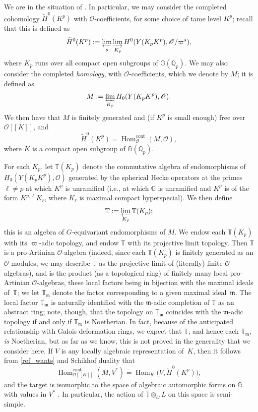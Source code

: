 \documentclass[11pt]{article}
\newcommand{\ie}{i.e.,\xspace}
\let\mathcal\mathscr
\theoremstyle{definition}
\DeclareMathOperator{\Hom}{Hom}
\newcommand{\br}[1]{[\![#1]\!]}
\newcommand{\Q}{\mathbb{Q}}
\newcommand{\Qp}{\mathbb {Q}_p}
\newcommand{\cO}{\mathcal{O}}
\newcommand{\cont}{\mathrm{cont}}
\begin{document}
We are in the situation of \cite[(3.2)]{em0}.
In particular, we may consider the completed cohomology
$\widetilde{H}^0(K^p)$ with $\mathcal O$-coefficients,
for some choice of tame level $K^p$;
recall that this is defined as
\[
\widetilde{H}^0(K^p) := \varprojlim_s \varinjlim_{K_p}
H^0( Y(K_pK^p) , \mathcal O/ \varpi^s),
\]
where $K_p$ runs over all compact open subgroups of $\mathbb G(\Q_p)$.
We may also consider the completed {\em homology}, with $\mathcal O$-coefficients,
which we denote by $M$;
it is defined as
\[
M := \varprojlim_{K_p}
H_0(Y(K_pK^p) ,\mathcal O).
\]
We then have
that $M$ is finitely generated and (if $K^p$ is small enough)
free over~$\mathcal O\br{K}$, and
\begin{equation}\label{ref_wants}
\widetilde{H}^0(K^p) = \Hom^{\cont}_{\mathcal O}(M,\cO),
\end{equation}
where $K$ is a compact open subgroup of $\mathbb G(\Qp)$.

For each $K_p$, let $\mathbb T(K_p)$ denote the commutative algebra
of endomorphisms of
$H_0
(Y(K_pK^p) ,
\mathcal O)$
generated by the spherical Hecke operators
at the primes $\ell \neq p$ at which $K^p$ is unramified (\ie at which
$\mathbb G$ is unramified and $K^p$ is of the form
$K^{p,\ell} K_{\ell}$, where $K_{\ell}$ is maximal compact hyperspecial).
We then define
\[
\mathbb T := \varprojlim_{K_p} \mathbb T(K_p);
\]
this is an algebra of $G$-equivariant endomorphisms of $M$.
We endow each $\mathbb T(K_p)$ with its $\varpi$-adic topology,
and endow $\mathbb T$ with its projective limit topology.
Then $\mathbb T$ is a pro-Artinian $\mathcal O$-algebra
(indeed, since each $\mathbb T(K_p)$ is finitely generated as an $\mathcal O$-modules,
we may describe $\mathbb T$ as
the projective limit of (literally) finite $\mathcal O$-algebras),
and is the product (as a topological ring) of finitely many local pro-Artinian
$\mathcal O$-algebras,
these local factors being in bijection with the maximal ideals of~$\mathbb T$;
we let $\mathbb T_{\mathfrak m}$ denote the factor corresponding to a given
maximal ideal~$\mathfrak m$.
The local factor $\mathbb T_{\mathfrak m}$ is naturally identified with
the $\mathfrak m$-adic completion of $\mathbb T$ as an abstract ring;
note, though, that the topology on $\mathbb T_{\mathfrak m}$ coincides with the
$\mathfrak m$-adic topology if and only if $\mathbb T_{\mathfrak m}$
is Noetherian. In fact, because of the anticipated relationship
with Galois deformation rings, we expect that $\mathbb T$,
and hence each $\mathbb T_{\mathfrak m}$, {\em is} Noetherian,
but as far as we know, this is not proved in the generality that we consider here.
If $V$ is any locally algebraic representation of~$K$,
then it follows from \eqref{ref_wants} and Schikhof duality \cite[Th.\,3.5]{iw} that
\[
\Hom_{\mathcal O\br{K}}^{\cont}(M,V^*) =
\Hom_{ K} \bigl(V, \widetilde{H}^0(K^p)\bigr),
\]
and the target is isomorphic to the space of algebraic automorphic forms
on $\mathbb G$ with values in $V^*$ \cite[Prop.\,3.2.4]{em0}.
In particular, the action of $\mathbb T \otimes_{\mathcal O}L$ on
this space is semi-simple.
\end{document}

